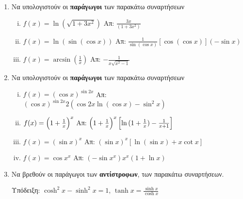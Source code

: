 



\pagestyle{askhseis}
\everymath{\displaystyle}




\begin{center}
  \minibox{\large \bfseries \textcolor{Col1}{Ασκήσεις στις Παραγώγους}}
\end{center}

\vspace{\baselineskip}

\begin{enumerate}

  \item Να υπολογιστούν οι \textbf{παράγωγοι} των παρακάτω συναρτήσεων
    \begin{enumerate}[(i)]
      \item $ f(x) = \ln{\left(\sqrt{1+3x^{2}}\right)} $ \hfill Απ: $
        \frac{3x}{(1+3x^{2})} $
      \item $ f(x) = \ln({\sin({\cos{x}})}) $ \hfill Απ: $
        \frac{1}{\sin{(\cos{x})}} [\cos{(\cos{x})}] (- \sin{x}) $ 
      \item $ f(x)= \arcsin(\frac{1}{x}) $ \hfill Απ: $ - \frac{1}{x \sqrt{x^{2}-1}} $ 
    \end{enumerate}

  \item  Να υπολογιστούν οι \textbf{παράγωγοι} των παρακάτω συναρτήσεων

    \begin{enumerate}[(i)]
      \item $ f(x) = (\cos{x})^{\sin{2x}} $ \hfill Απ: $
        (\cos{x})^{\sin{2x}} 2(\cos{2x} \ln{(\cos{x})} - \sin^{2}{x}) $
      \item $ f(x) = \Bigl(1 + \frac{1}{x}\Bigr)^{x} $ \hfill Απ: $
        \Bigl(1 + \frac{1}{x}\Bigr)^{x}\left[\ln{(1 + \frac{1}{x})} -
        \frac{1}{x+1}\right] $
      \item $ f(x)=(\sin{x})^{x} $ \hfill Απ: $ (\sin{x})^{x}[\ln{(\sin{x}
        )} + x \cot{x}] $ 
      \item $ f(x)=\cos{x}^{x} $ \hfill Απ: $ (- \sin{x^{x}})x^{x} (1 +
        \ln{x}) $
    \end{enumerate}

  \item Να βρεθούν οι παράγωγοι των \textbf{αντίστροφων}, των παρακάτω συναρτήσεων.

    \textcolor{Col1}{Υπόδειξη:} 
    $ \cosh^{2}{x} - \sinh^{2}{x} = 1 $, \;
    $ \tanh{x} = \frac{\sinh{x}}{\cosh{x}} $ 
    \begin{enumerate}[(i)]
    \end{enumerate}


\end{enumerate}
